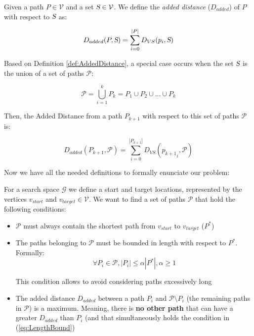 \documentclass[graybox]{svmult}
\newcommand{\PathSet}{\ensuremath{\mathcal P} }
\newcommand{\Path}{\ensuremath{P} }
\newcommand{\Graph}{\ensuremath{\mathcal G} }
\newcommand{\VertexSet}{\ensuremath{\mathcal V} }
\newcommand{\Set}{\ensuremath{\textsl S} }
\newcommand{\VertexSetDistance}{\ensuremath{D_{VS}} }
\newcommand{\AddedDistance}{\ensuremath{D_{added}} }
\begin{document}
\begin{definition}
\label{def:AddedDistance}
Given a path $\Path \in \VertexSet$ and a set $\Set \in \VertexSet$. We define the \emph{added distance} ($\AddedDistance$) of $\Path$ with respect to $\Set$ as:

\[ \AddedDistance (\Path, \Set) = \sum _{i = 0}^{|\Path|} \VertexSetDistance(p_{i}, \Set) \]

\end{definition}

Based on Definition \ref{def:AddedDistance}, a special case occurs when the set $\Set$ is the union of a set of paths $\PathSet$:

\[ \PathSet = \bigcup_{i = 1}^{k} \Path_{k} = \Path_{1} \cup \Path_{2} \cup ... \cup \Path_{k} \] 

Then, the Added Distance from a path $P_{k+1}$ with respect to this set of paths $\PathSet$ is:

\begin{equation} 
\AddedDistance (\Path_{k+1}, \PathSet) =  \sum _{i = 0}^{|\Path_{k+1}|} \VertexSetDistance({p_{k+1}}_{i}, \PathSet) 
\label{eq:PathDistance}
\end{equation}

Now we have all the needed definitions to formally enunciate our problem:

\begin{definition}
For a search space \Graph we define a start and target locations, represented by the vertices $v_{start}$ and $v_{target} \in \VertexSet$.  We want to find a set of paths $\PathSet$ that hold the following conditions:

\begin{itemize}
\item{$\PathSet$ must always contain the shortest path from $v_{start}$ to $v_{target}$ ($\Path^{*}$)  }
\item{The paths belonging to $\PathSet$ must be bounded in length with respect to $\Path^{*}$. Formally:
\begin{equation} 
\forall \Path_{i} \in \PathSet, \left | \Path_{i} \right | \leq \alpha \left| \Path^{*} \right |, \alpha \geq 1 
\label{eq:LengthBound}
\end{equation}

This condition allows to avoid considering paths excessively long}
\item{The added distance $\AddedDistance$ between a path $\Path_{i}$ and $\PathSet \setminus \Path_{i}$ (the remaining paths in $\PathSet$) is a maximum. Meaning, there is \textbf{no other path} that can have a greater $\AddedDistance$ than $\Path_{i}$ (and that simultaneously holds the condition in (\ref{eq:LengthBound}) }
\end{itemize}
\end{definition}
\end{document}

